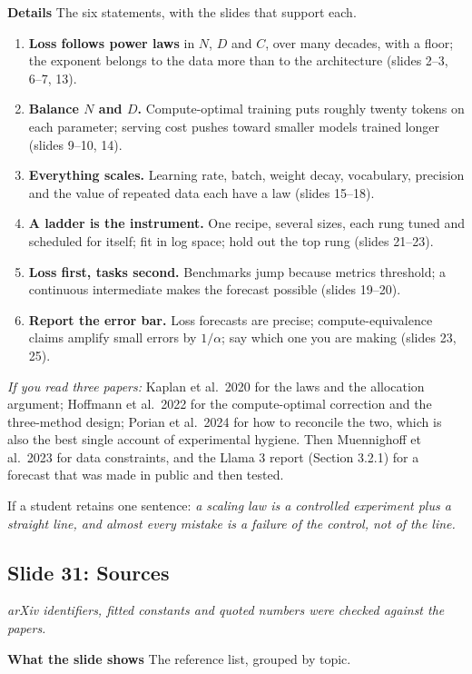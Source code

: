 \documentclass[11pt,letterpaper]{article}
\newcommand{\slide}[3]{%
  \subsection[Slide #1: #2]{Slide #1: #2}%
  {\color{muted}\itshape #3\par}\medskip}
\newcommand{\para}[1]{\medskip\noindent\textbf{#1}\quad}
\newenvironment{intuition}{\begin{tcolorbox}[intuitionbox]}{\end{tcolorbox}}
\begin{document}
\para{Details} The six statements, with the slides that support each.
\begin{enumerate}
\item \textbf{Loss follows power laws} in $N$, $D$ and $C$, over many decades, with a floor; the exponent belongs to the data more than to the architecture (slides 2--3, 6--7, 13).
\item \textbf{Balance $N$ and $D$.} Compute-optimal training puts roughly twenty tokens on each parameter; serving cost pushes toward smaller models trained longer (slides 9--10, 14).
\item \textbf{Everything scales.} Learning rate, batch, weight decay, vocabulary, precision and the value of repeated data each have a law (slides 15--18).
\item \textbf{A ladder is the instrument.} One recipe, several sizes, each rung tuned and scheduled for itself; fit in log space; hold out the top rung (slides 21--23).
\item \textbf{Loss first, tasks second.} Benchmarks jump because metrics threshold; a continuous intermediate makes the forecast possible (slides 19--20).
\item \textbf{Report the error bar.} Loss forecasts are precise; compute-equivalence claims amplify small errors by $1/\alpha$; say which one you are making (slides 23, 25).
\end{enumerate}

\emph{If you read three papers:} Kaplan et al.\ 2020 for the laws and the allocation argument; Hoffmann et al.\ 2022 for the compute-optimal correction and the three-method design; Porian et al.\ 2024 for how to reconcile the two, which is also the best single account of experimental hygiene. Then Muennighoff et al.\ 2023 for data constraints, and the Llama 3 report (Section 3.2.1) for a forecast that was made in public and then tested.

\begin{intuition}
If a student retains one sentence: \emph{a scaling law is a controlled experiment plus a straight line, and almost every mistake is a failure of the control, not of the line.}
\end{intuition}

\slide{31}{Sources}{arXiv identifiers, fitted constants and quoted numbers were checked against the papers.}

\para{What the slide shows} The reference list, grouped by topic.
\end{document}
